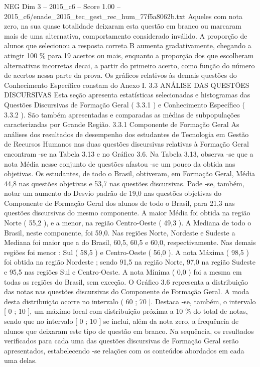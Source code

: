 \begin{textsample}{NEG Dim 3 – 2015\_c6 – Score 1.00 – 2015\_c6/enade\_2015\_tec\_gest\_rec\_hum\_77f5a8062b.txt}
Aqueles com nota zero, na sua quase totalidade deixaram esta questão em branco ou marcaram mais de uma alternativa, comportamento considerado inválido.
A proporção de alunos que selecionou a resposta correta B aumenta gradativamente, chegando a atingir 100 \% para 19 acertos ou mais, enquanto a proporção dos que escolheram alternativas incorretas decai, a partir do primeiro acerto, como função do número de acertos nessa parte da prova.
Os gráficos relativos às demais questões do Conhecimento Específico constam do Anexo I. 3.3 ANÁLISE DAS QUESTÕES DISCURSIVAS Esta seção apresenta estatísticas selecionadas e histogramas das Questões Discursivas de Formação Geral ( 3.3.1 ) e Conhecimento Específico ( 3.3.2 ).
São também apresentadas e comparadas as médias de subpopulações caracterizadas por Grande Região. 3.3.1 Componente de Formação Geral As análises dos resultados de desempenho dos estudantes de Tecnologia em Gestão de Recursos Humanos nas duas questões discursivas relativas à Formação Geral encontram -se na Tabela 3.13 e no Gráfico 3.6.
Na Tabela 3.13, observa -se que a nota Média nesse conjunto de questões afastou -se um pouco da obtida nas objetivas.
Os estudantes, de todo o Brasil, obtiveram, em Formação Geral, Média 44,8 nas questões objetivas e 53,7 nas questões discursivas.
Pode -se, também, notar um aumento do Desvio padrão de 19,0 nas questões objetivas do Componente de Formação Geral dos alunos de todo o Brasil, para 21,3 nas questões discursivas do mesmo componente.
A maior Média foi obtida na região Norte ( 55,2 ), e a menor, na região Centro-Oeste ( 49,3 ).
A Mediana de todo o Brasil, neste componente, foi 59,0.
Nas regiões Norte, Nordeste e Sudeste a Mediana foi maior que a do Brasil, 60,5, 60,5 e 60,0, respectivamente.
Nas demais regiões foi menor : Sul ( 58,5 ) e Centro-Oeste ( 56,0 ).
A nota Máxima ( 98,5 ) foi obtida na região Nordeste ; sendo 91,5 na região Norte, 97,0 na região Sudeste e 95,5 nas regiões Sul e Centro-Oeste.
A nota Mínima ( 0,0 ) foi a mesma em todas as regiões do Brasil, sem exceção.
O Gráfico 3.6 representa a distribuição das notas nas questões discursivas do Componente de Formação Geral.
A moda desta distribuição ocorre no intervalo ( 60 ; 70 ].
Destaca -se, também, o intervalo [ 0 ; 10 ], um máximo local com distribuição próxima a 10 \% do total de notas, sendo que no intervalo [ 0 ; 10 ] se inclui, além da nota zero, a frequência de alunos que deixaram este tipo de questão em branco.
Na sequência, os resultados verificados para cada uma das questões discursivas de Formação Geral serão apresentados, estabelecendo -se relações com os conteúdos abordados em cada uma delas.

\end{textsample}
